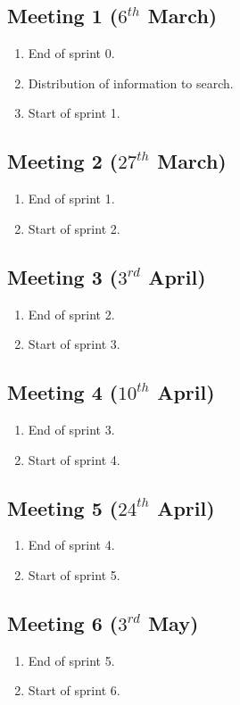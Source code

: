 \subsection{Meeting 1 ($6^{th}$ March)}
\begin{enumerate}
	\item End of sprint 0.
	\item Distribution of information to search.
	\item Start of sprint 1.
\end{enumerate}

\subsection{Meeting 2 ($27^{th}$ March)}
\begin{enumerate}
	\item End of sprint 1.
	\item Start of sprint 2.
\end{enumerate}

\subsection{Meeting 3 ($3^{rd}$ April)}
\begin{enumerate}
	\item End of sprint 2.
	\item Start of sprint 3.
\end{enumerate}

\subsection{Meeting 4 ($10^{th}$ April)}
\begin{enumerate}
	\item End of sprint 3.
	\item Start of sprint 4.
\end{enumerate}

\subsection{Meeting 5 ($24^{th}$ April)}
\begin{enumerate}
	\item End of sprint 4.
	\item Start of sprint 5.
\end{enumerate}

\subsection{Meeting 6 ($3^{rd}$ May)}
\begin{enumerate}
	\item End of sprint 5.
	\item Start of sprint 6.
\end{enumerate}

